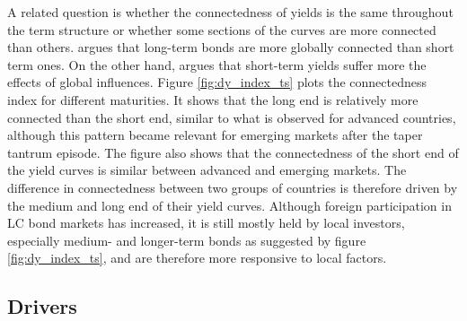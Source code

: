 {%
A related question is whether the connectedness of yields is the same throughout the term structure or whether some sections of the curves are more connected than others.
\cite{Obstfeld:2015} 
argues that long-term bonds are more globally connected than short term ones.
On the other hand, \cite{Kalemli-Ozcan:2019} argues that short-term yields suffer more the effects of global influences.
Figure \ref{fig:dy_index_ts} plots the connectedness index for different maturities.
It shows that the long end is relatively more connected than the short end, similar to what is observed for advanced countries, although this pattern became relevant for emerging markets after the taper tantrum episode.
The figure also shows that the connectedness of the short end of the yield curves is similar between advanced and emerging markets.
The difference in connectedness between two groups of countries is therefore driven by the medium and long end of their yield curves.
Although foreign participation in LC bond markets has increased, it is still mostly held by local investors, especially medium- and longer-term bonds as suggested by figure \ref{fig:dy_index_ts}, 
and are therefore more responsive to local factors.


\subsection{Drivers} \label{sec:Drivers}
\iftoggle{toclinks}{\gototoc}{} %

}
